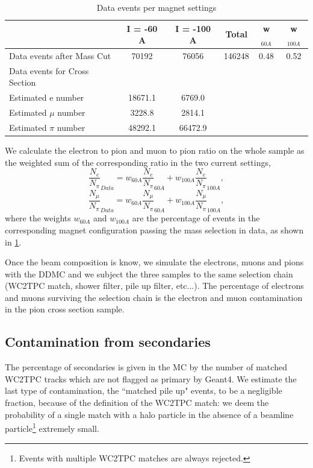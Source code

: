 \begin{table}[]
\centering
\label{tab:databreakdown}
\begin{tabular}{|l|c|c|c|c|c|}
\hline
                                                     & I = -60 A          & I = -100 A   & Total     &  w$_{60A}$ &  w$_{100A}$\\ \hline
Data events after Mass Cut         &     70192          &  76056       & 146248 & 0.48 & 0.52\\ \hline
Data events for Cross Section     &                         &                   &              & & \\ \hline
Estimated e number                     &   18671.1         &    6769.0  &              & & \\ \hline
Estimated $\mu$ number             &     3228.8         &     2814.1     &              & & \\ \hline
Estimated $\pi$ number               &    48292.1        &   66472.9   &              & & \\ \hline
\end{tabular}
\caption{Data events per magnet settings}
\end{table}



We calculate the electron to pion and muon to pion ratio on the whole sample as the weighted sum of the corresponding ratio in the two current settings, 
\begin{equation}
\frac{N_e}{N_\pi}_{Data} = w_{60A}\frac{N_e}{N_\pi}_{60A}  + w_{100A}\frac{N_e}{N_\pi}_{100A},
\end{equation}
\begin{equation}
\frac{N_\mu}{N_\pi}_{Data} = w_{60A}\frac{N_\mu}{N_\pi}_{60A}  + w_{100A}\frac{N_\mu}{N_\pi}_{100A},
\end{equation}
where the weights $w_{60A}$ and $w_{100A}$ are the percentage of events in the corresponding magnet configuration passing the mass selection in data, as shown in \ref{tab:databreakdown}.


Once the beam composition is know,  we simulate the electrons, muons and pions with the DDMC and we subject the three samples to the same selection chain (WC2TPC match, shower filter, pile up filter, etc...). The percentage of electrons and muons surviving the selection chain is the  electron and muon contamination in the pion cross section sample.

\subsection{Contamination from secondaries}
The percentage of secondaries is given in the MC by the number of matched WC2TPC tracks which are not flagged as primary by Geant4.
We estimate the last type of contamination, the ``matched pile up" events, to be a negligible fraction, because of the definition of the WC2TPC match: we deem the probability of a single match with a halo particle in the absence of a beamline particle\footnote{ Events with multiple WC2TPC matches are always rejected.} extremely small.

